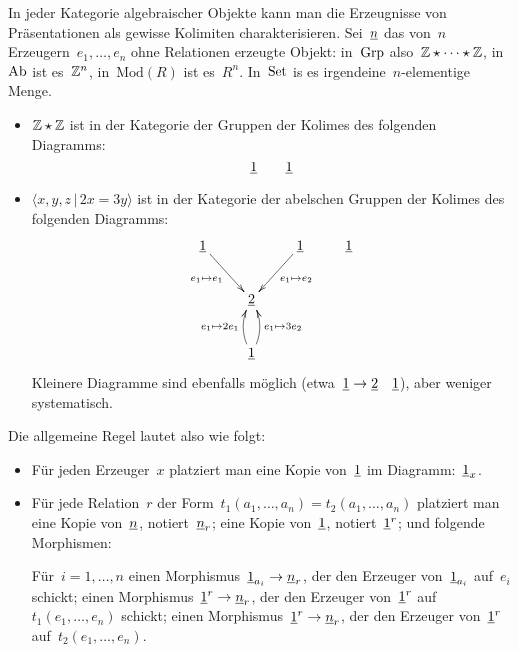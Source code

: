 \documentclass{uebblatt}
\begin{document}
In jeder Kategorie algebraischer Objekte kann man die Erzeugnisse von
Präsentationen als gewisse Kolimiten charakterisieren. Sei~$\underline{n}$ das von~$n$
Erzeugern~$e_1,\ldots,e_n$ ohne Relationen erzeugte Objekt: in~$\mathrm{Grp}$ also~$\mathbb{Z}
\star \cdots \star \mathbb{Z}$, in~$\mathrm{Ab}$ ist es~$\mathbb{Z}^n$, in~$\mathrm{Mod}(R)$ ist
es~$R^n$. In~$\mathrm{Set}$ is es irgendeine~$n$-elementige Menge.

\begin{itemize}
\item $\mathbb{Z} \star \mathbb{Z}$ ist in der Kategorie der Gruppen der Kolimes des
folgenden Diagramms:
\[ \underline{1} \qquad \underline{1} \]
\item $\langle x,y,z \,|\, 2x = 3y \rangle$ ist in der Kategorie der abelschen
Gruppen der Kolimes des folgenden Diagramms:
\[ \xymatrix{
  \ul{1} \ar[rd]_{e_1 \mapsto e_1} && \ul{1} \ar[ld]^{e_1 \mapsto e_2} & \ul{1} \\
  & \ul{2} \\
  & \ul{1} \ar@/^/[u]^{e_1 \mapsto 2e_1} \ar@/_/[u]_{e_1 \mapsto 3e_2}
} \]
Kleinere Diagramme sind ebenfalls möglich (etwa~$\underline{1} \to \underline{2} \quad
\underline{1}$), aber weniger systematisch.
\end{itemize}

Die allgemeine Regel lautet also wie folgt:
\begin{itemize}
\item Für jeden Erzeuger~$x$ platziert man eine Kopie von~$\underline{1}$ im
Diagramm:~$\underline{1}_x$.
\item Für jede Relation~$r$ der Form~$t_1(a_1,\ldots,a_n) =
t_2(a_1,\ldots,a_n)$ platziert man eine Kopie von~$\underline{n}$,
notiert~$\underline{n}_r$; eine Kopie von~$\underline{1}$, notiert~$\underline{1}^r$; und
folgende Morphismen:

Für~$i=1,\ldots,n$ einen Morphismus~$\underline{1}_{a_i} \to \underline{n}_r$, der
den Erzeuger von~$\underline{1}_{a_i}$ auf~$e_i$ schickt; einen
Morphismus~$\underline{1}^r \to \underline{n}_r$, der den Erzeuger von~$\underline{1}^r$
auf~$t_1(e_1,\ldots,e_n)$ schickt; einen Morphismus~$\underline{1}^r \to \underline{n}_r$,
der den Erzeuger von~$\underline{1}^r$ auf~$t_2(e_1,\ldots,e_n)$.
\end{itemize}
\end{document}
